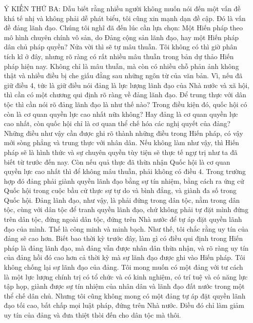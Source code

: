 Ý KIẾN THỨ BA: Dẫu biết rằng nhiều người không muốn nói đến một vấn đề khá tế nhị và không phải dễ phát biểu, tôi cũng xin mạnh dạn đề cập. Đó là vấn đề đảng lãnh đạo. Chúng tôi nghĩ đã đến lúc cần lựa chọn: Một Hiến pháp theo mô hình chuyên chính vô sản, do Đảng cộng sản lãnh đạo, hay một Hiến pháp dân chủ pháp quyền? Nửa vời thì sẽ tự mâu thuẫn. Tôi không có thì giờ phân tích kĩ ở đây, nhưng rõ ràng có rất nhiều mâu thuẫn trong bản dự thảo Hiến pháp hiện nay. Không chỉ là mâu thuẫn, mà còn có nhiều chỗ phản ảnh không thật và nhiều điều bị che giấu đằng sau những ngôn từ của văn bản. Vì, nếu đã giữ điều 4, tức là giữ điều nói đảng là lực lượng lãnh đạo của Nhà nước và xã hội, thì cần có một chương qui định rõ ràng về đảng lãnh đạo. Để trung thực với dân tộc thì cần nói rõ đảng lãnh đạo là như thế nào? Trong điều kiện đó, quốc hội có còn là cơ quan quyền lực cao nhất nữa không? Hay đảng là cơ quan quyền lực cao nhất, còn quốc hội chỉ là cơ quan thể chế hóa các nghị quyết của đảng? Những điều như vậy cần được ghi rõ thành những điều trong Hiến pháp, có vậy mới sòng phẳng và trung thực với nhân dân. Nếu không làm như vậy, thì Hiến pháp sẽ là hình thức và sự chuyên quyền tùy tiện sẽ thực tế ngự trị như ta đã biết từ trước đến nay. Còn nếu quả thực đã thừa nhận Quốc hội là cơ quan quyền lực cao nhất thì để không mâu thuẫn, phải không có điều 4. Trong trường hợp đó đảng phải giành quyền lãnh đạo bằng sự tín nhiệm, bằng cách ra ứng cử Quốc hội trong cuộc bầu cử thực sự tự do và bình đẳng, và giành đa số trong Quốc hội. Đảng lãnh đạo, như vậy, là phải đứng trong dân tộc, nằm trong dân tộc, cùng với dân tộc để tranh quyền lãnh đạo, chứ không phải tự đặt mình đứng trên dân tộc, đứng ngoài dân tộc, đứng trên Nhà nước để tự áp đặt quyền lãnh đạo của mình. Thế là công minh và minh bạch. Như thế, tôi chắc rằng uy tín của đảng sẽ cao hơn. Biết bao thời kỳ trước đây, làm gì có điều qui định trong Hiến pháp là đảng lãnh đạo, mà đảng vẫn được nhân dân thừa nhận, và rõ ràng uy tín của đảng hồi đó cao hơn cả thời kỳ mà sự lãnh đạo được ghi vào Hiến pháp. Tôi không chống lại sự lãnh đạo của đảng. Tôi mong muốn có một đảng với tư cách là một lực lượng chính trị có tổ chức và có kinh nghiệm, có trí tuệ và có năng lực tập họp, giành được sự tín nhiệm của nhân dân và lãnh đạo đất nước trong một thể chế dân chủ. Nhưng tôi cũng không mong có một đảng tự áp đặt quyền lãnh đạo tối cao, bất chấp mọi luật pháp, đứng trên Nhà nước. Điều đó chỉ làm giảm uy tín của đảng và đưa thiệt thòi đến cho dân tộc mà thôi.

